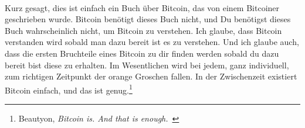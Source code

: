 \paragraph{}
Kurz gesagt, dies ist einfach ein Buch über Bitcoin, das von einem Bitcoiner
geschrieben wurde. Bitcoin benötigt dieses Buch nicht, und Du benötigst dieses
Buch wahrscheinlich nicht, um Bitcoin zu verstehen. Ich glaube, dass Bitcoin
verstanden wird sobald man dazu bereit ist es zu verstehen. Und ich glaube auch,
dass die ersten Bruchteile eines Bitcoin zu dir finden werden sobald du dazu
bereit bist diese zu erhalten. Im Wesentlichen wird bei jedem, ganz individuell,
zum richtigen Zeitpunkt der orange Groschen fallen. In der Zwischenzeit
existiert Bitcoin einfach, und das ist genug.\footnote{Beautyon,
\textit{Bitcoin is. And that is enough.}~\cite{bitcoin-is}}
